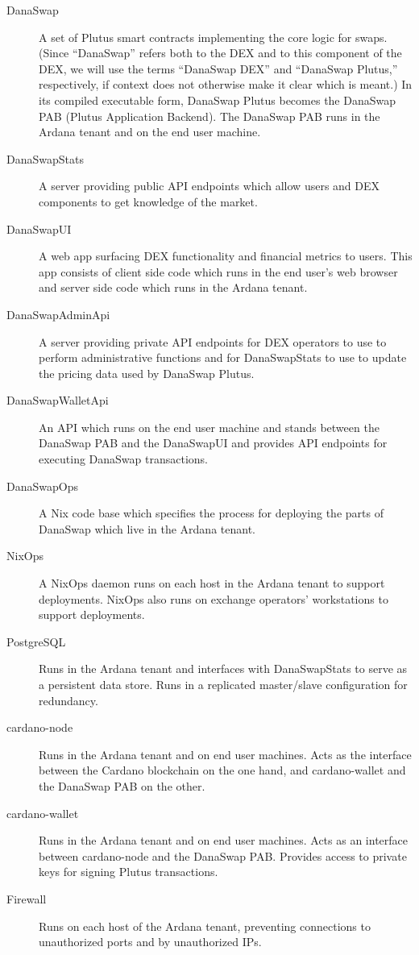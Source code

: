 \documentclass[12pt]{article}
\begin{document}
\begin{description}
	\item[DanaSwap] A set of Plutus smart contracts implementing the core logic for swaps. (Since ``DanaSwap'' refers both to the DEX and to this component of the DEX, we will use the terms ``DanaSwap DEX'' and ``DanaSwap Plutus,'' respectively, if context does not otherwise make it clear which is meant.) In its compiled executable form, DanaSwap Plutus becomes the DanaSwap PAB (Plutus Application Backend). The DanaSwap PAB runs in the Ardana tenant and on the end user machine.
	\item[DanaSwapStats] A server providing public API endpoints which allow users and DEX components to get knowledge of the market.
	\item[DanaSwapUI] A web app surfacing DEX functionality and financial metrics to users. This app consists of client side code which runs in the end user's web browser and server side code which runs in the Ardana tenant.
	\item[DanaSwapAdminApi] A server providing private API endpoints for DEX operators to use to perform administrative functions and for DanaSwapStats to use to update the pricing data used by DanaSwap Plutus.
	\item[DanaSwapWalletApi] An API which runs on the end user machine and stands between the DanaSwap PAB and the DanaSwapUI and provides API endpoints for executing DanaSwap transactions.
	\item[DanaSwapOps] A Nix code base which specifies the process for deploying the parts of DanaSwap which live in the Ardana tenant.
	\item[NixOps] A NixOps daemon runs on each host in the Ardana tenant to support deployments. NixOps also runs on exchange operators' workstations to support deployments.
	\item[PostgreSQL] Runs in the Ardana tenant and interfaces with DanaSwapStats to serve as a persistent data store. Runs in a replicated master/slave configuration for redundancy.
	\item[cardano-node] Runs in the Ardana tenant and on end user machines. Acts as the interface between the Cardano blockchain on the one hand, and cardano-wallet and the DanaSwap PAB on the other.
	\item[cardano-wallet] Runs in the Ardana tenant and on end user machines. Acts as an interface between cardano-node and the DanaSwap PAB. Provides access to private keys for signing Plutus transactions.
	\item[Firewall] Runs on each host of the Ardana tenant, preventing connections to unauthorized ports and by unauthorized IPs.

\end{description}
\end{document}

